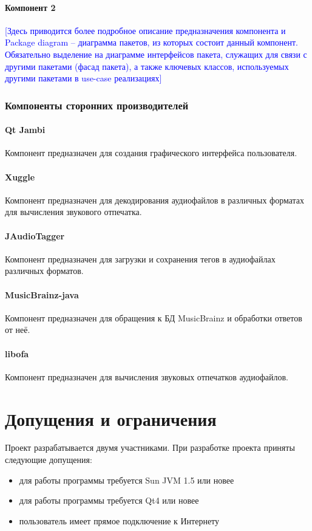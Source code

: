 \documentclass[pdftex,12pt,a4paper]{report}
\providecommand{\comment}[1]{\textcolor{blue}{#1}}
\begin{document}
\paragraph{Компонент 2}
\comment{[Здесь приводится более подробное описание предназначения компонента и Package diagram – диаграмма пакетов, из которых состоит данный компонент. Обязательно выделение на диаграмме интерфейсов пакета, служащих для связи с другими пакетами (фасад пакета), а также ключевых классов, используемых другими пакетами в use-case реализациях]}

\subsubsection{Компоненты сторонних производителей}
\paragraph{Qt Jambi}
Компонент предназначен для создания графического интерфейса пользователя.

\paragraph{Xuggle}
Компонент предназначен для декодирования аудиофайлов в различных форматах для вычисления звукового отпечатка.

\paragraph{JAudioTagger}
Компонент предназначен для загрузки и сохранения тегов в аудиофайлах различных форматов.

\paragraph{MusicBrainz-java}
Компонент предназначен для обращения к БД MusicBrainz и обработки ответов от неё.

\paragraph{libofa}
Компонент предназначен для вычисления звуковых отпечатков аудиофайлов.

\section{Допущения и ограничения}
Проект разрабатывается двумя участниками.
При разработке проекта приняты следующие допущения:
\begin{itemize}
	\item для работы программы требуется Sun JVM 1.5 или новее
	\item для работы программы требуется Qt4 или новее
	\item пользователь имеет прямое подключение к Интернету
\end{itemize}
\end{document}
